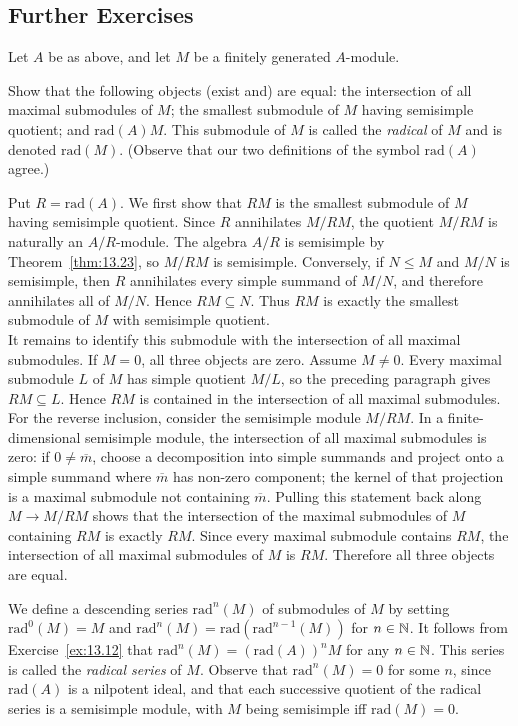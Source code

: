 \documentclass[../Odyssey_Project.tex]{subfiles}
\begin{document}
\subsection*{Further Exercises}

Let $A$ be as above, and let $M$ be a finitely generated $A$-module.

\begin{exercise}
\label{ex:13.12}
Show that the following objects (exist and) are equal: the intersection of all maximal submodules of $M$; the smallest submodule of $M$ having semisimple quotient; and $\mathrm{rad}(A)M$. This submodule of $M$ is called the \emph{radical} of $M$ and is denoted $\mathrm{rad}(M)$. (Observe that our two definitions of the symbol $\mathrm{rad}(A)$ agree.)
\end{exercise}
\begin{solution}
    Put $R=\mathrm{rad}(A)$. We first show that $RM$ is the smallest submodule of $M$ having semisimple quotient. Since $R$ annihilates $M/RM$, the quotient $M/RM$ is naturally an $A/R$-module. The algebra $A/R$ is semisimple by Theorem~\ref{thm:13.23}, so $M/RM$ is semisimple. Conversely, if $N\leq M$ and $M/N$ is semisimple, then $R$ annihilates every simple summand of $M/N$, and therefore annihilates all of $M/N$. Hence $RM\subseteq N$. Thus $RM$ is exactly the smallest submodule of $M$ with semisimple quotient.\\
    It remains to identify this submodule with the intersection of all maximal submodules. If $M=0$, all three objects are zero. Assume $M\neq0$. Every maximal submodule $L$ of $M$ has simple quotient $M/L$, so the preceding paragraph gives $RM\subseteq L$. Hence $RM$ is contained in the intersection of all maximal submodules.\\
    For the reverse inclusion, consider the semisimple module $M/RM$. In a finite-dimensional semisimple module, the intersection of all maximal submodules is zero: if $0\neq \overline{m}$, choose a decomposition into simple summands and project onto a simple summand where $\overline{m}$ has non-zero component; the kernel of that projection is a maximal submodule not containing $\overline{m}$. Pulling this statement back along $M\to M/RM$ shows that the intersection of the maximal submodules of $M$ containing $RM$ is exactly $RM$. Since every maximal submodule contains $RM$, the intersection of all maximal submodules of $M$ is $RM$. Therefore all three objects are equal.
\end{solution}

We define a descending series $\mathrm{rad}^n(M)$ of submodules of $M$ by setting $\mathrm{rad}^0(M) = M$ and $\mathrm{rad}^n(M) = \mathrm{rad}(\mathrm{rad}^{n-1}(M))$ for $n \in \mathbb{N}$. It follows from Exercise~\ref{ex:13.12} that $\mathrm{rad}^n(M) = (\mathrm{rad}(A))^n M$ for any $n \in \mathbb{N}$. This series is called the \emph{radical series} of $M$. Observe that $\mathrm{rad}^n(M) = 0$ for some $n$, since $\mathrm{rad}(A)$ is a nilpotent ideal, and that each successive quotient of the radical series is a semisimple module, with $M$ being semisimple iff $\mathrm{rad}(M) = 0$.
\end{document}
